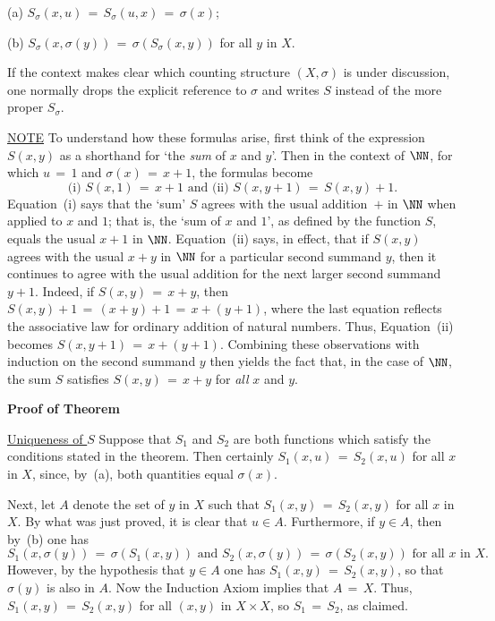 {        (a) $S_{{\sigma}}(x,u) \,=\, S_{{\sigma}}(u,x) \,=\, {\sigma}(x)$;

        (b) $S_{{\sigma}}(x,{\sigma}(y)) \,=\, {\sigma}(S_{{\sigma}}(x,y))$ for all $y$ in $X$.

\noindent If the context makes clear which counting structure $(X,{\sigma})$ is under discussion,
    one normally drops the explicit reference to ${\sigma}$ and writes $S$ instead of the more proper $S_{{\sigma}}$.

\V

        \underline{NOTE} To understand how these formulas arise, first think of the expression $S(x,y)$ as a shorthand for `the {\em sum} of $x$ and $y$'.
    Then in the context of  ${\NN}$, for which $u \,=\, 1$ and ${\sigma}(x) \,=\, x+1$, the formulas become
        \begin{displaymath}
        \mbox{(i) } S(x,1) \,=\, x+1 \mbox{ and } \mbox{(ii) } S(x,y+1) \,=\, S(x,y)+1.
        \end{displaymath}
    Equation~(i) says that the `sum' $S$ agrees with the usual addition~$+$ in ${\NN}$ when applied to $x$ and $1$;
    that is, the `sum of $x$ and $1$', as defined by the function $S$, equals the usual $x+1$ in ${\NN}$.
    Equation~(ii) says, in effect, that if $S(x,y)$ agrees with the usual $x+y$ in ${\NN}$ for a particular second summand $y$,
    then it continues to agree with the usual addition for the next larger second summand $y+1$.
    Indeed, if $S(x,y) \,=\, x+y$, then $S(x,y)+1 \,=\, (x+y)+1 \,=\, x+(y+1)$, where the last equation reflects the associative law for ordinary addition of  natural numbers.
    Thus, Equation~(ii) becomes $S(x,y+1) \,=\, x+(y+1)$. Combining these observations with induction on the second summand $y$ then yields the fact that, 
    in the case of ${\NN}$, the sum $S$ satisfies $S(x,y) \,=\, x+y$ for {\em all} $x$ and $y$.

\V

        {\bf Proof of Theorem}

\V

        \underline{Uniqueness of $S$} Suppose that $S_{1}$ and $S_{2}$ are both functions which satisfy the conditions stated in the theorem.
    Then certainly $S_{1}(x,u) \,=\, S_{2}(x,u)$ for all $x$ in $X$, since, by~(a), both quantities equal ${\sigma}(x)$.

        Next, let $A$ denote the set of $y$ in $X$ such that $S_{1}(x,y) \,=\, S_{2}(x,y)$ for all $x$ in $X$.
    By what was just proved, it is clear that $u{\in}A$.
    Furthermore, if $y{\in}A$, then by~(b) one has
        \begin{displaymath}
        S_{1}(x,{\sigma}(y)) \,=\, {\sigma}(S_{1}(x,y)) \mbox{ and }
        S_{2}(x,{\sigma}(y)) \,=\, {\sigma}(S_{2}(x,y)) \mbox{ for all $x$ in $X$}.
        \end{displaymath}
    However, by the hypothesis that $y{\in}A$ one has $S_{1}(x,y) \,=\, S_{2}(x,y)$, so that ${\sigma}(y)$  is also in $A$.
    Now the Induction Axiom implies that $A \,=\, X$.
    Thus, $S_{1}(x,y) \,=\, S_{2}(x,y)$ for all $(x,y)$ in $X{\times}X$, so $S_{1} \,=\, S_{2}$, as claimed.

}
